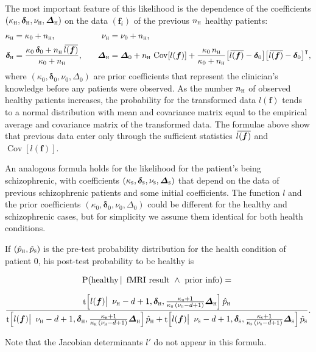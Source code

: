 \documentclass[%
]{frontiersSCNS-nologo} %
\newcommand*{\widebar}[1]{{\mkern1.5mu\skew{2}\overline{\mkern-1.5mu#1\mkern-1.5mu}\mkern 1.5mu}}
\newcommand*{\p}{\mathrm{P}}%
\renewcommand*{\|}{\mathpunct{|}}%
\newcommand*{\bigcond}{\mathpunct{\big|\ }}%
\newcommand*{\Land}{\mathbin{\ \land\ }}
\newcommand*{\Cond}{\mathpunct{\,|\ }}%
\newcommand*{\T}{^\intercal}%
\newcommand*{\yhu}{\textsc{h}}
\newcommand*{\yhd}{\textsc{s}}
\newcommand*{\yxx}{f}
\newcommand*{\yx}{\bm{\yxx}}
\newcommand*{\ypph}{\Hat{p}_{\yhu}}
\newcommand*{\ypps}{\Hat{p}_{\yhd}}
\newcommand*{\yn}{n}
\newcommand*{\ynh}{\yn_{\yhu}}
\newcommand*{\yd}{d}
\newcommand*{\ytr}{l}
\newcommand*{\av}{\widebar}
\DeclareMathOperator{\Cov}{Cov}%
\DeclareMathOperator{\dstudentt}{t}
\newcommand*{\ymu}{\bm{\delta}}
\newcommand*{\yka}{\kappa}
\newcommand*{\ynu}{\nu}
\newcommand*{\yLa}{\bm{\varDelta}}
\newcommand*{\ymuo}{\ymu_0}
\newcommand*{\ykao}{\yka_0}
\newcommand*{\ynuo}{\ynu_0}
\newcommand*{\yLao}{\yLa_0}
\begin{document}
The most important feature of this likelihood is the dependence of the
coefficients $(\yka_{\yhu}, \ymu_{\yhu}, \ynu_{\yhu}, \yLa_{\yhu})$ on the
data $(\yx_i)$ of the previous $\ynh$ healthy patients:
\begin{equation}
  \label{eq:update_coeffs_healthy}
    \begin{aligned}
    \yka_{\yhu} &= \ykao + \ynh,\quad     &\ynu_{\yhu} &= \ynuo + \ynh,\\
    \ymu_{\yhu} &= \frac{\ykao\,\ymuo+\ynh\, \av{\ytr(\yx)}}{\ykao+\ynh},\quad
    &\yLa_{\yhu} &= \yLao + \ynh\, \Cov[\ytr(\yx)]
           + \frac{\ykao\,\ynh}{\ykao+\ynh} \bigl[\av{\ytr(\yx)}-\ymuo\bigr] \bigl[\av{\ytr(\yx)}-\ymuo\bigr]\T,
  \end{aligned}
\end{equation}
where $(\ykao,\ymuo,\ynuo,\yLao)$ are prior coefficients that represent the
clinician's knowledge before any patients were observed. As the number
$\ynh$ of observed healthy patients increases, the probability for the
transformed data $\ytr(\yx)$ tends to a normal distribution with mean and
covariance matrix equal to the empirical average and covariance matrix of
the transformed data. The formulae above show that previous data enter only
through the sufficient statistics $\av{\ytr(\yx)}$ and $\Cov[\ytr(\yx)]$.

An analogous formula holds for the likelihood for the patient's being
schizophrenic, with coefficients
$(\yka_{\yhd}, \ymu_{\yhd}, \ynu_{\yhd}, \yLa_{\yhd})$ that depend on the
data of previous schizophrenic patients and some initial coefficients. The
function $\ytr$ and the prior coefficients $(\ykao,\ymuo,\ynuo,\yLao)$
could be different for the healthy and schizophrenic cases, but for
simplicity we assume them identical for both health conditions.

\bigskip

If $(\ypph,\ypps)$ is the pre-test probability distribution for the health
condition of patient $0$, his post-test probability to be healthy is
\begin{shaded}
  \begin{multline}
    \label{eq:post-test_final}
    \p(\text{healthy}\Cond \text{fMRI result}\Land\text{prior info})
    ={}\\[2\jot]
    \frac{\dstudentt\Bigl[\ytr(\yx) \bigcond \ynu_{\yhu}-\yd+1, \ymu_{\yhu},
      \tfrac{\yka_{\yhu}+1}{\yka_{\yhu}\,(\ynu_{\yhu}-\yd+1)}\yLa_{\yhu} \Bigr]
      \,\ypph}{
      \dstudentt\Bigl[\ytr(\yx) \bigcond \ynu_{\yhu}-\yd+1, \ymu_{\yhu},
      \tfrac{\yka_{\yhu}+1}{\yka_{\yhu}\,(\ynu_{\yhu}-\yd+1)}\yLa_{\yhu} \Bigr]
      \,\ypph
      +
      \dstudentt\Bigl[\ytr(\yx) \bigcond \ynu_{\yhd}-\yd+1, \ymu_{\yhd},
      \tfrac{\yka_{\yhd}+1}{\yka_{\yhd}\,(\ynu_{\yhd}-\yd+1)}\yLa_{\yhd} \Bigr]
      \,\ypps
    }.
  \end{multline}
\end{shaded}
\noindent Note that the Jacobian determinants $\ytr'$ do not appear in this
formula.
\end{document}

